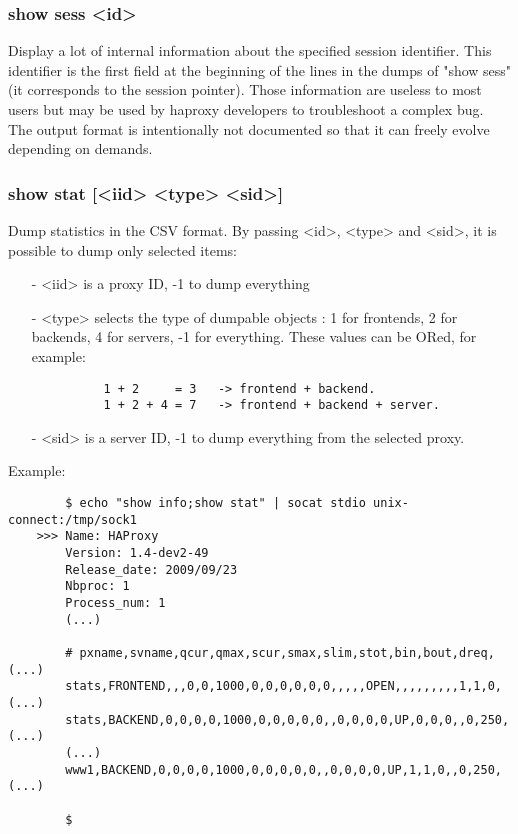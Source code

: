 \subsubsection[show sess]{show sess <id>}
  Display a lot of internal information about the specified session identifier.
  This identifier is the first field at the beginning of the lines in the dumps
  of "show sess" (it corresponds to the session pointer). Those information are
  useless to most users but may be used by haproxy developers to troubleshoot a
  complex bug. The output format is intentionally not documented so that it can
  freely evolve depending on demands.

\subsubsection[show stat]{show stat [<iid> <type> <sid>]}
  Dump statistics in the CSV format. By passing <id>, <type> and <sid>, it is
  possible to dump only selected items:
  \begin{itemize}
  \item[-] <iid> is a proxy ID, -1 to dump everything
  \item[-] <type> selects the type of dumpable objects : 1 for frontends, 2 for
       backends, 4 for servers, -1 for everything. These values can be ORed,
       for example:
       \begin{verbatim}
          1 + 2     = 3   -> frontend + backend.
          1 + 2 + 4 = 7   -> frontend + backend + server.
       \end{verbatim}
  \item[-] <sid> is a server ID, -1 to dump everything from the selected proxy.
  \end{itemize}

  Example:
  \begin{verbatim}
        $ echo "show info;show stat" | socat stdio unix-connect:/tmp/sock1
    >>> Name: HAProxy
        Version: 1.4-dev2-49
        Release_date: 2009/09/23
        Nbproc: 1
        Process_num: 1
        (...)

        # pxname,svname,qcur,qmax,scur,smax,slim,stot,bin,bout,dreq,  (...)
        stats,FRONTEND,,,0,0,1000,0,0,0,0,0,0,,,,,OPEN,,,,,,,,,1,1,0, (...)
        stats,BACKEND,0,0,0,0,1000,0,0,0,0,0,,0,0,0,0,UP,0,0,0,,0,250,(...)
        (...)
        www1,BACKEND,0,0,0,0,1000,0,0,0,0,0,,0,0,0,0,UP,1,1,0,,0,250, (...)

        $
    \end{verbatim}

